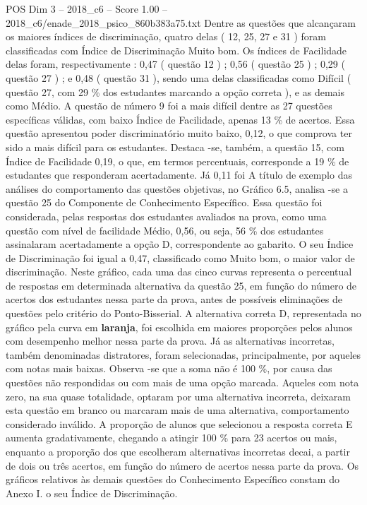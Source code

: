 \begin{textsample}{POS Dim 3 – 2018\_c6 – Score 1.00 – 2018\_c6/enade\_2018\_psico\_860b383a75.txt}
Dentre as questões que alcançaram os maiores índices de discriminação, quatro delas ( 12, 25, 27 e 31 ) foram classificadas com Índice de Discriminação Muito bom.
Os índices de Facilidade delas foram, respectivamente : 0,47 ( questão 12 ) ; 0,56 ( questão 25 ) ; 0,29 ( questão 27 ) ; e 0,48 ( questão 31 ), sendo uma delas classificadas como Difícil ( questão 27, com 29 \% dos estudantes marcando a opção correta ), e as demais como Médio.
A questão de número 9 foi a mais difícil dentre as 27 questões específicas válidas, com baixo Índice de Facilidade, apenas 13 \% de acertos.
Essa questão apresentou poder discriminatório muito baixo, 0,12, o que comprova ter sido a mais difícil para os estudantes.
Destaca -se, também, a questão 15, com Índice de Facilidade 0,19, o que, em termos percentuais, corresponde a 19 \% de estudantes que responderam acertadamente.
Já 0,11 foi A título de exemplo das análises do comportamento das questões objetivas, no Gráfico 6.5, analisa -se a questão 25 do Componente de Conhecimento Específico.
Essa questão foi considerada, pelas respostas dos estudantes avaliados na prova, como uma questão com nível de facilidade Médio, 0,56, ou seja, 56 \% dos estudantes assinalaram acertadamente a opção D, correspondente ao gabarito.
O seu Índice de Discriminação foi igual a 0,47, classificado como Muito bom, o maior valor de discriminação.
Neste gráfico, cada uma das cinco curvas representa o percentual de respostas em determinada alternativa da questão 25, em função do número de acertos dos estudantes nessa parte da prova, antes de possíveis eliminações de questões pelo critério do Ponto-Bisserial.
A alternativa correta D, representada no gráfico pela curva em \textbf{laranja}, foi escolhida em maiores proporções pelos alunos com desempenho melhor nessa parte da prova.
Já as alternativas incorretas, também denominadas distratores, foram selecionadas, principalmente, por aqueles com notas mais baixas.
Observa -se que a soma não é 100 \%, por causa das questões não respondidas ou com mais de uma opção marcada.
Aqueles com nota zero, na sua quase totalidade, optaram por uma alternativa incorreta, deixaram esta questão em branco ou marcaram mais de uma alternativa, comportamento considerado inválido.
A proporção de alunos que selecionou a resposta correta E aumenta gradativamente, chegando a atingir 100 \% para 23 acertos ou mais, enquanto a proporção dos que escolheram alternativas incorretas decai, a partir de dois ou três acertos, em função do número de acertos nessa parte da prova.
Os gráficos relativos às demais questões do Conhecimento Específico constam do Anexo I. o seu Índice de Discriminação.

\end{textsample}
